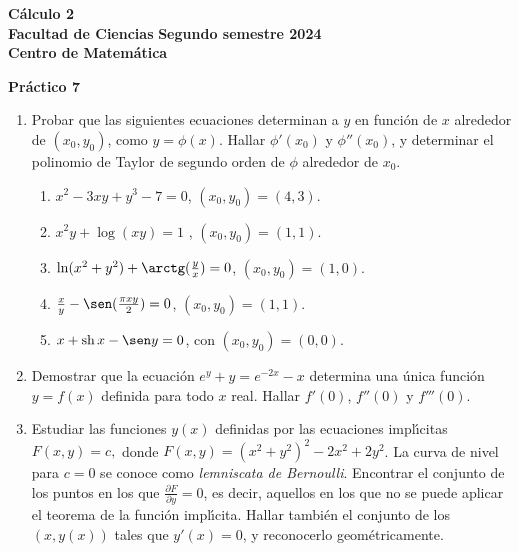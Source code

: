 \documentclass[11pt]{article}
\DeclareMathOperator{\sh}{sh}
\newcommand{\depa}[2]{\ensuremath{\frac{\partial {#1}}{\partial {#2}} }}
\begin{document}
 \hfill {\bf C\'{a}lculo 2} \\
{\bf Facultad de Ciencias} \hfill {\bf Segundo semestre 2024} \\
{\bf Centro de Matem\'{a}tica} 

\vspace{1cm}

\begin{center}
{\bf Pr\'{a}ctico 7 }
\end{center}

\vspace{0,1cm}

\begin{enumerate}

\item Probar que las siguientes ecuaciones determinan a $y$ en función de $x$ alrededor de $(x_0, y_0)$, como $y=\phi(x)$. 
Hallar $\phi'(x_0)$ y $\phi''(x_0)$, y determinar el polinomio de Taylor de segundo orden de $\phi$ alrededor de $x_0$.

\begin{enumerate}

\item $x^2-3xy+y^3-7=0$, $(x_0,y_0)=(4,3)$.

\item $x^2y + \log(xy)=1$ , $(x_0,y_0) = (1, 1)$.

\item $\ln(x^2+y^2)+\arctg(\frac{y}{x})=0$, $(x_0,y_0)=(1,0)$.
 
\item $\frac{x}{y}-\sen(\frac{\pi xy}{2})=0$, $(x_0,y_0)=(1,1)$. 

\item $x+\sh x-\sen y=0$, con $(x_0,y_0)=(0,0)$.
 
\end{enumerate}

\item Demostrar que la ecuaci\'on $e^y+y=e^{-2x}-x$
  determina una \'unica funci\'on $y=f(x)$ definida para todo $x$
  real. Hallar $f'(0)$, $f''(0)$ y $f'''(0)$. 
  
\item Estudiar las funciones $y(x)$ definidas por las ecuaciones
  impl\'\i citas  $F(x,y)=c,$ donde $F(x,y)=(x^2+y^2)^2-2x^2+2y^2$. La
  curva de nivel para $c=0$ se conoce como \textit{lemniscata de
  Bernoulli}. Encontrar el conjunto de los puntos en los que
$\depa{F}{y}=0$, es decir, aquellos en los que no se puede aplicar el
teorema de la funci\'on impl\'\i cita. Hallar tambi\'en el conjunto de los $(x,y(x))$ tales que $y'(x)=0$, y reconocerlo geom\'etricamente.  


\end{enumerate}
\end{document}
